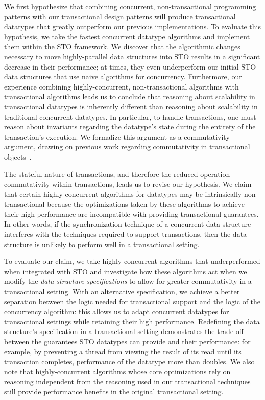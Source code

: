 We first hypothesize that combining concurrent, non-transactional programming patterns with our transactional design patterns will produce transactional datatypes that greatly outperform our previous implementations. To evaluate this hypothesis, we take the fastest concurrent datatype algorithms and implement them within the STO framework. We discover that the algorithmic changes necessary to move highly-parallel data structures into STO results in a significant decrease in their performance; at times, they even underperform our initial STO data structures that use naive algorithms for concurrency.
Furthermore, our experience combining highly-concurrent, non-transactional algorithms with transactional algorithms leads us to conclude that reasoning about scalability in transactional datatypes is inherently different than reasoning about scalability in traditional concurrent datatypes. In particular, to handle transactions, one must reason about invariants regarding the datatype's state during the entirety of the transaction's execution. We formalize this argument as a commutativity argument, drawing on previous work regarding commutativity in transactional objects~\cite{schwarz, weihl}.

The stateful nature of transactions, and therefore the reduced operation commutativity within transactions, leads us to revise our hypothesis. 
We claim that certain highly-concurrent algorithms for datatypes may be intrinsically non-transactional because the optimizations taken by these algorithms to achieve their high performance are incompatible with providing transactional guarantees. In other words, if the synchronization technique of a concurrent data structure interferes with the techniques required to support transactions, then the data structure is unlikely to perform well in a transactional setting. 

To evaluate our claim, we take highly-concurrent algorithms that underperformed when integrated with STO and investigate how these algorithms act when we modify the \emph{data structure specifications} to allow for greater commutativity in a transactional setting. With an alternative specification, we achieve a better separation between the logic needed for transactional support and the logic of the concurrency algorithm: this allows us to adapt concurrent datatypes for transactional settings while retaining their high performance.
Redefining the data structure's specification in a transactional setting demonstrates the trade-off between the guarantees STO datatypes can provide and their performance: for example, by preventing a thread from viewing the result of its read until its transaction completes, performance of the datatype more than doubles.
We also note that highly-concurrent algorithms whose core optimizations rely on reasoning independent from the reasoning used in our transactional techniques still provide performance benefits in the original transactional setting.

